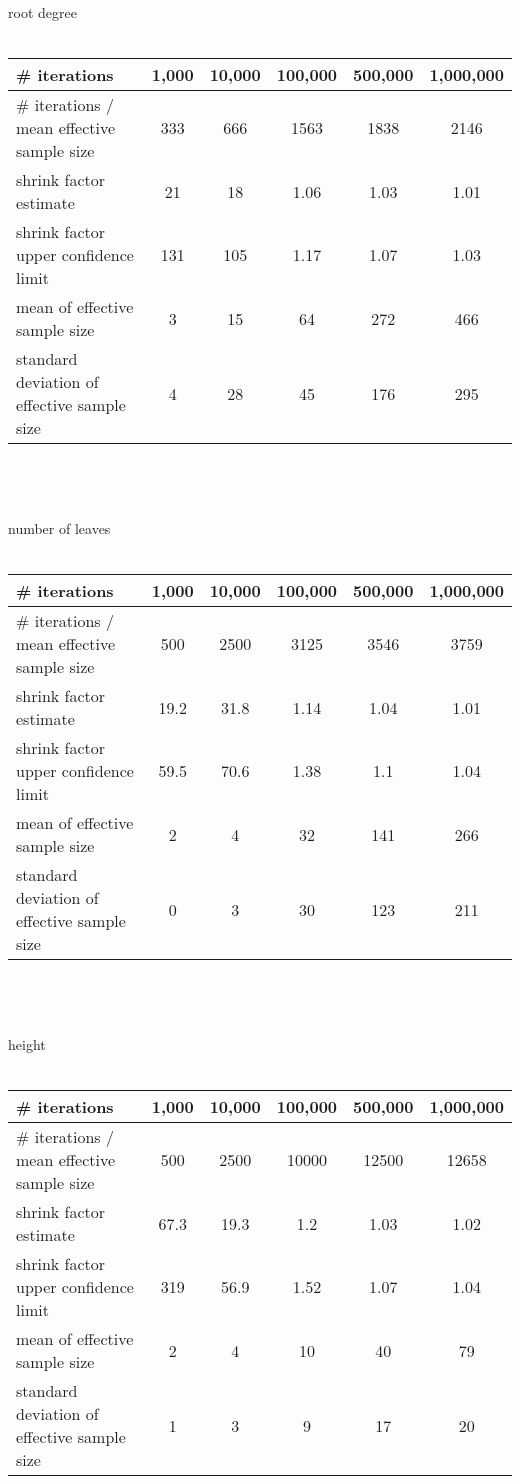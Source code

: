 \documentclass{article}
\begin{document}
{\LARGE root degree}	\\
\\
\begin{tabular}{| l | c | c |c | c | c |}
	\hline
	\# iterations&1,000&10,000&100,000&500,000&1,000,000 \\ \hline
	\# iterations / mean effective sample size&333&666&1563&1838&2146\\
	shrink factor estimate&21&18&1.06&1.03&1.01\\
	shrink factor upper confidence limit&131&105&1.17&1.07&1.03\\
	mean of effective sample size&3&15&64&272&466\\
	standard deviation of effective sample size&4&28&45&176&295\\
	\hline
\end{tabular}
\\
\\
\\

{\LARGE number of leaves} \\
\\
\begin{tabular}{| l | c | c |c | c | c |}	
	\hline
	\# iterations&1,000&10,000&100,000&500,000&1,000,000 \\ \hline
	\# iterations / mean effective sample size&500&2500&3125&3546&3759\\
	shrink factor estimate&19.2&31.8&1.14&1.04&1.01\\
	shrink factor upper confidence limit&59.5&70.6&1.38&1.1&1.04\\
	mean of effective sample size&2&4&32&141&266\\
	standard deviation of effective sample size&0&3&30&123&211\\
	\hline
\end{tabular}
\\
\\
\\

{\LARGE height}	\\
\\
\begin{tabular}{| l | c | c |c | c | c |}
	\hline
	\# iterations&1,000&10,000&100,000&500,000&1,000,000 \\ \hline
	\# iterations / mean effective sample size&500&2500&10000&12500&12658\\
	shrink factor estimate&67.3&19.3&1.2&1.03&1.02\\
	shrink factor upper confidence limit&319&56.9&1.52&1.07&1.04\\
	mean of effective sample size&2&4&10&40&79\\
	standard deviation of effective sample size&1&3&9&17&20\\
	\hline
\end{tabular}
\end{document}
